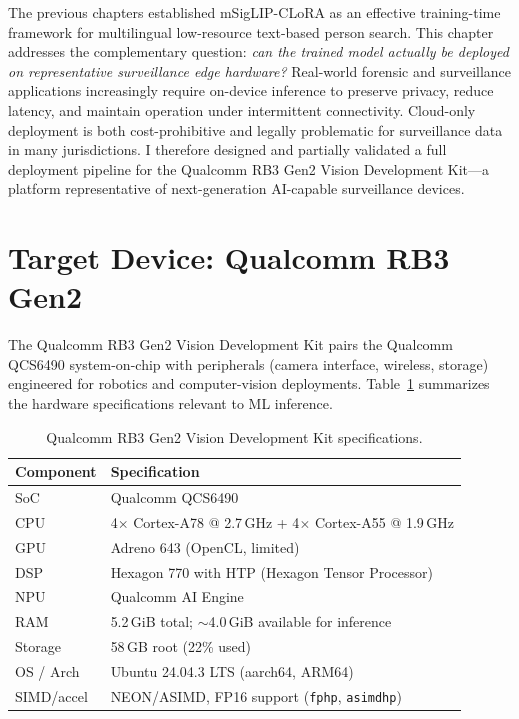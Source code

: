 \documentclass[../main.tex]{subfiles}
\begin{document}
\noindent The previous chapters established mSigLIP-CLoRA as an effective training-time framework for multilingual low-resource text-based person search. This chapter addresses the complementary question: \textit{can the trained model actually be deployed on representative surveillance edge hardware?} Real-world forensic and surveillance applications increasingly require on-device inference to preserve privacy, reduce latency, and maintain operation under intermittent connectivity. Cloud-only deployment is both cost-prohibitive and legally problematic for surveillance data in many jurisdictions. I therefore designed and partially validated a full deployment pipeline for the Qualcomm RB3 Gen2 Vision Development Kit---a platform representative of next-generation AI-capable surveillance devices.

\section{Target Device: Qualcomm RB3 Gen2}
\label{sec:rb3_target}

\noindent The Qualcomm RB3 Gen2 Vision Development Kit pairs the Qualcomm QCS6490 system-on-chip with peripherals (camera interface, wireless, storage) engineered for robotics and computer-vision deployments. Table~\ref{tab:rb3_specs} summarizes the hardware specifications relevant to ML inference.

\begin{table}[htbp]
\centering
\caption{Qualcomm RB3 Gen2 Vision Development Kit specifications.}
\label{tab:rb3_specs}
\renewcommand{\arraystretch}{1.3}
\begin{tabularx}{\textwidth}{lX}
\toprule
\textbf{Component} & \textbf{Specification} \\
\midrule
SoC        & Qualcomm QCS6490 \\
CPU        & 4$\times$ Cortex-A78 @ 2.7\,GHz + 4$\times$ Cortex-A55 @ 1.9\,GHz \\
GPU        & Adreno 643 (OpenCL, limited) \\
DSP        & Hexagon 770 with HTP (Hexagon Tensor Processor) \\
NPU        & Qualcomm AI Engine \\
RAM        & 5.2\,GiB total; $\sim$4.0\,GiB available for inference \\
Storage    & 58\,GB root (22\% used) \\
OS / Arch  & Ubuntu 24.04.3 LTS (aarch64, ARM64) \\
SIMD/accel & NEON/ASIMD, FP16 support (\texttt{fphp}, \texttt{asimdhp}) \\
\bottomrule
\end{tabularx}
\end{table}
\end{document}
